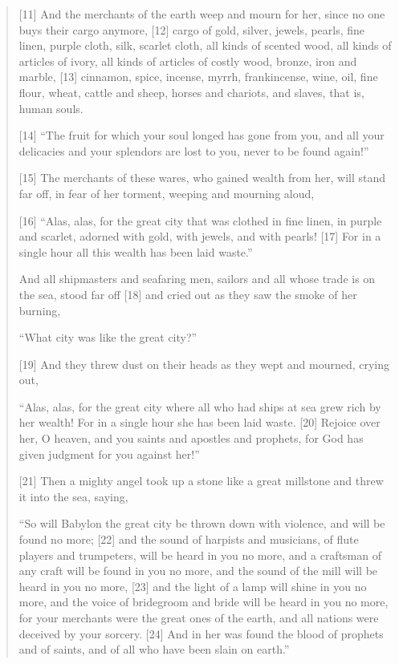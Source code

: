 \begin{quote}
    [11] And the merchants of the earth weep and mourn for her, since no one buys their cargo anymore, [12] cargo of gold, silver, jewels, pearls, fine linen, purple cloth, silk, scarlet cloth, all kinds of scented wood, all kinds of articles of ivory, all kinds of articles of costly wood, bronze, iron and marble, [13] cinnamon, spice, incense, myrrh, frankincense, wine, oil, fine flour, wheat, cattle and sheep, horses and chariots, and slaves, that is, human souls.

    [14] “The fruit for which your soul longed
        has gone from you,
    and all your delicacies and your splendors
        are lost to you,
        never to be found again!”


    [15] The merchants of these wares, who gained wealth from her, will stand far off, in fear of her torment, weeping and mourning aloud,

    [16] “Alas, alas, for the great city
        that was clothed in fine linen,
            in purple and scarlet,
        adorned with gold,
            with jewels, and with pearls!
    [17] For in a single hour all this wealth has been laid waste.”


    And all shipmasters and seafaring men, sailors and all whose trade is on the sea, stood far off [18] and cried out as they saw the smoke of her burning,

    “What city was like the great city?”


    [19] And they threw dust on their heads as they wept and mourned, crying out,

    “Alas, alas, for the great city
        where all who had ships at sea
        grew rich by her wealth!
    For in a single hour she has been laid waste.
    [20] Rejoice over her, O heaven,
        and you saints and apostles and prophets,
    for God has given judgment for you against her!”


    [21] Then a mighty angel took up a stone like a great millstone and threw it into the sea, saying,

    “So will Babylon the great city be thrown down with violence,
        and will be found no more;
    [22] and the sound of harpists and musicians, of flute players and trumpeters,
        will be heard in you no more,
    and a craftsman of any craft
        will be found in you no more,
    and the sound of the mill
        will be heard in you no more,
    [23] and the light of a lamp
        will shine in you no more,
    and the voice of bridegroom and bride
        will be heard in you no more,
    for your merchants were the great ones of the earth,
        and all nations were deceived by your sorcery.
    [24] And in her was found the blood of prophets and of saints,
        and of all who have been slain on earth.”
  \end{quote}

